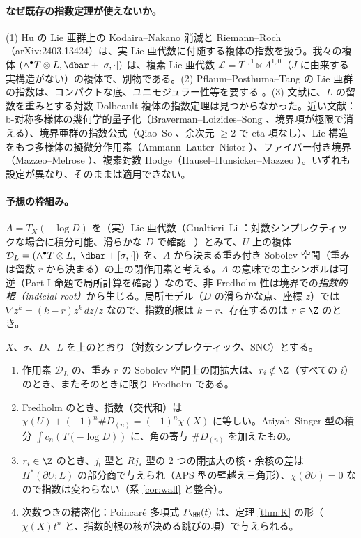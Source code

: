 \paragraph{なぜ既存の指数定理が使えないか。}(1) Hu の Lie 亜群上の Kodaira--Nakano 消滅と Riemann--Roch（arXiv:2403.13424）\cite{Hu}は、実 Lie 亜代数に付随する複体の指数を扱う。我々の複体 $(\wedge^\bullet T\otimes L,\dbar+[\sigma,\cdot])$ は、複素 Lie 亜代数 $\mathcal L=T^{0,1}\ltimes A^{1,0}$（$J$ に由来する実構造がない）の複体で、別物である。(2) Pflaum--Posthuma--Tang \cite{PPT} の Lie 亜群の指数は、コンパクトな底、ユニモジュラー性等を要する \tQ。(3) 文献に、$L$ の留数を重みとする対数 Dolbeault 複体の指数定理は見つからなかった。近い文献：b-対称多様体の幾何学的量子化（Braverman--Loizides--Song \cite{BLS}、境界項が極限で消える）、境界亜群の指数公式（Qiao--So \cite{QS}、余次元 $\ge2$ で eta 項なし）、Lie 構造をもつ多様体の擬微分作用素（Ammann--Lauter--Nistor \cite{ALN}）、ファイバー付き境界（Mazzeo--Melrose \cite{MM}）、複素対数 Hodge（Hausel--Hunsicker--Mazzeo \cite{HHM}）。いずれも設定が異なり、そのままは適用できない。

\paragraph{予想の枠組み。}$A=T_X(-\log D)$ を（実）Lie 亜代数（Gualtieri--Li \cite{GL}：対数シンプレクティックな場合に積分可能、滑らかな $D$ で確認 \tC\ \tQ）とみて、$U$ 上の複体 $\mathcal D_L=(\wedge^\bullet T\otimes L,\ \dbar+[\sigma,\cdot])$ を、$A$ から決まる重み付き Sobolev 空間（重みは留数 $r$ から決まる）の上の閉作用素と考える。$A$ の意味での主シンボルは可逆（Part I 命題で局所計算を確認 \tV）なので、非 Fredholm 性は境界での\emph{指数的根（indicial root）}から生じる。局所モデル（$D$ の滑らかな点、座標 $z$）では $\nabla z^k=(k-r)z^k\,dz/z$ なので、指数的根は $k=r$、存在するのは $r\in\Z$ のとき。

\begin{conj}[指数予想\ \tK]\label{conj:index}
$X$、$\sigma$、$D$、$L$ を上のとおり（対数シンプレクティック、SNC）とする。
\begin{enumerate}
\item[(I1)] 作用素 $\mathcal D_L$ の、重み $r$ の Sobolev 空間上の閉拡大は、$r_i\notin\Z$（すべての $i$）のとき、またそのときに限り Fredholm である。
\item[(I2)] Fredholm のとき、指数（交代和）は $\chi(U)+(-1)^n\#D_{(n)}=(-1)^n\chi(X)$ に等しい。Atiyah--Singer 型の積分 $\int c_n(T(-\log D))$ に、角の寄与 $\#D_{(n)}$ を加えたもの。
\item[(I3)] $r_i\in\Z$ のとき、$j_!$ 型と $Rj_*$ 型の 2 つの閉拡大の核・余核の差は $H^*(\partial U;L)$ の部分商で与えられ（APS 型の壁越え三角形）、$\chi(\partial U)=0$ なので指数は変わらない（系 \ref{cor:wall} と整合）。
\item[(I4)] 次数つきの精密化：Poincar\'e 多項式 $P_{\HH}(t)$ は、定理 \ref{thm:K} の形（$\chi(X)t^n$ と、指数的根の核が決める跳びの項）で与えられる。
\end{enumerate}
\end{conj}
